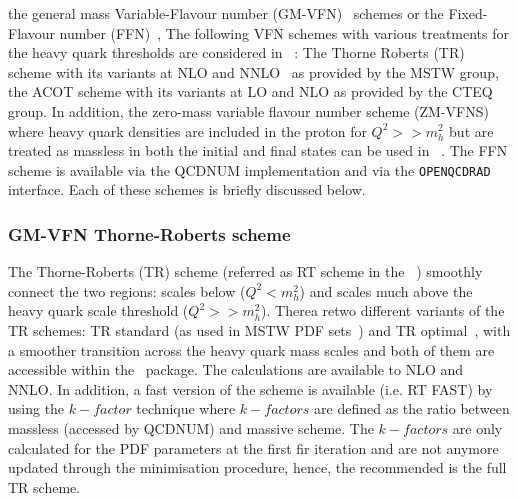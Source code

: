 the general mass Variable-Flavour number (GM-VFN)~\cite{VFN} schemes or the
Fixed-Flavour number (FFN)~\cite{Laenen:1992, Laenen:1993, Riem:1995}, 
%
The following VFN schemes with various treatments for the heavy 
quark thresholds are considered in \fitter\ :
The Thorne Roberts (TR) scheme with its variants at NLO and
NNLO~\cite{Thorne:1997ga,Thorne:2006qt} as provided by the MSTW group,
the ACOT scheme with its variants at LO and NLO as provided by the CTEQ group. 
In addition, the zero-mass variable flavour number scheme (ZM-VFNS) where 
heavy quark densities are included in the proton for $Q^2>>m_h^2$ but are treated 
as massless in both the initial and final states can be used in \fitter\ .
The FFN scheme is available via the QCDNUM implementation and via the 
{\tt OPENQCDRAD}~\cite{openqcdrad:page} interface.
Each of these schemes is briefly discussed below.

\subsubsection{GM-VFN Thorne-Roberts scheme}

The Thorne-Roberts (TR) scheme (referred as RT scheme in the \fitter\ )
smoothly connect the two regions: 
scales below ($Q^2<m_h^2$) and scales much above the heavy quark scale threshold ($Q^2>>m_h^2$). 
Therea retwo different variants of the TR schemes: TR standard (as used in MSTW PDF 
sets~\cite{Thorne:2006qt,Martin:epC63}) 
and TR optimal~\cite{Thorne:6180}, with a smoother transition across the heavy quark mass scales 
and both of them are accessible within the \fitter\ package.
The calculations are available to NLO and NNLO. In addition, a fast version of the scheme 
is available (i.e. RT FAST) by using the $k-factor$ technique where $k-factors$ are defined 
as the ratio between massless (accessed by QCDNUM) and massive scheme. 
The $k-factors$ are only calculated for the PDF parameters at the first fir iteration
and are not anymore updated through the minimisation procedure, hence, the recommended 
is the full TR scheme.
